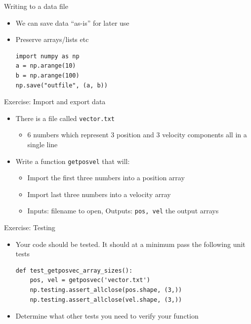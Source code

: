 \documentclass[11pt,professionalfonts]{beamer}
\begin{document}
\begin{frame}[fragile]{Writing to a data file}
    \begin{itemize}
        \item We can save data ``as-is'' for later use
        \item Preserve arrays/lists etc
            \begin{verbatim}
import numpy as np
a = np.arange(10)
b = np.arange(100)
np.save("outfile", (a, b))
            \end{verbatim}
    \end{itemize}
\end{frame}

\begin{frame}{Exercise: Import and export data}
    \begin{itemize}
        \item There is a file called \texttt{vector.txt} 
            \begin{itemize}
                \item 6 numbers which represent 3 position and 3 velocity components all in a single line
            \end{itemize}
        \item Write a function \texttt{getposvel} that will:
            \begin{itemize}
                \item Import the first three numbers into a position array
                \item Import last three numbers into a velocity array
                \item Inputs: filename to open, Outputs: \texttt{pos, vel} the output arrays
            \end{itemize}
    \end{itemize}
\end{frame}

\begin{frame}[fragile]{Exercise: Testing}
    \begin{itemize}
        \item Your code should be tested. 
            It should at a minimum pass the following unit tests
    \begin{verbatim}
def test_getposvec_array_sizes():
    pos, vel = getposvec('vector.txt')
    np.testing.assert_allclose(pos.shape, (3,))
    np.testing.assert_allclose(vel.shape, (3,))
    \end{verbatim}
    \item Determine what other tests you need to verify your function
    \end{itemize}
\end{frame}
\end{document}
